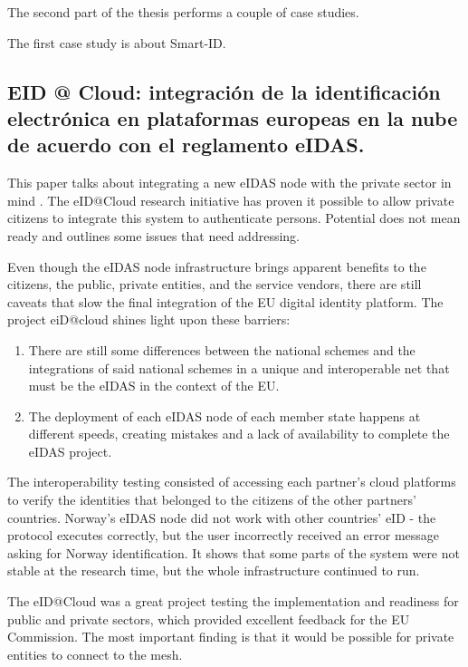 The second part of the thesis performs a couple of case studies.

The first case study is about Smart-ID.


\subsection{EID @ Cloud: integración de la identificación electrónica en plataformas europeas en la nube de acuerdo con el reglamento eIDAS.}

This paper talks about integrating a new eIDAS node with the private sector in mind \cite{guerola2019eid}. The eID@Cloud research initiative has proven it possible to allow private citizens to integrate this system to authenticate persons. Potential does not mean ready and outlines some issues that need addressing.

Even though the eIDAS node infrastructure brings apparent benefits to the citizens, the public, private entities, and the service vendors, there are still caveats that slow the final integration of the EU digital identity platform. The project eiD@cloud shines light upon these barriers:

\begin{enumerate}
    \item There are still some differences between the national schemes and the integrations of said national schemes in a unique and interoperable net that must be the eIDAS in the context of the EU.
    \item The deployment of each eIDAS node of each member state happens at different speeds, creating mistakes and a lack of availability to complete the eIDAS project. 
\end{enumerate}

The interoperability testing consisted of accessing each partner's cloud platforms to verify the identities that belonged to the citizens of the other partners' countries. Norway's eIDAS node did not work with other countries' eID - the protocol executes correctly, but the user incorrectly received an error message asking for Norway identification. It shows that some parts of the system were not stable at the research time, but the whole infrastructure continued to run.

The eID@Cloud was a great project testing the implementation and readiness for public and private sectors, which provided excellent feedback for the EU Commission. The most important finding is that it would be possible for private entities to connect to the mesh.


